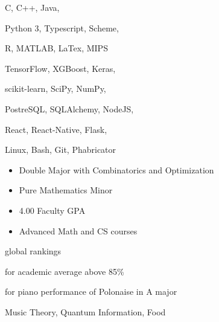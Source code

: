C, C++, Java,
\smallskip

Python 3, Typescript, Scheme,
\smallskip

R, MATLAB, LaTex, MIPS

\divider\smallskip

TensorFlow, XGBoost, Keras,
\smallskip

scikit-learn, SciPy, NumPy,
\smallskip

PostreSQL, SQLAlchemy, NodeJS,
\smallskip

React, React-Native, Flask,

\divider\smallskip

Linux, Bash, Git, Phabricator


\begin{itemize}
    \item Double Major with Combinatorics and Optimization
    \item Pure Mathematics Minor
    \item 4.00 Faculty GPA
    \item Advanced Math and CS courses
\end{itemize}


global rankings

\divider\smallskip

for academic average above 85\%

\divider\smallskip

for piano performance of Polonaise in A major

\divider\smallskip


Music Theory, Quantum Information, Food

